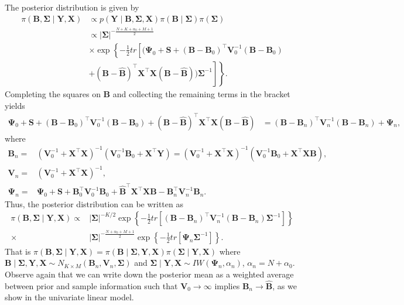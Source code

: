 The posterior distribution is given by
\begin{align*}
	\pi({\bm{B}},{\bm{\Sigma}}\mid {\bm{Y}},{\bm{X}})&\propto  p({\bm{Y}}\mid {\bm{B}},{\bm{\Sigma}},{\bm{X}}) \pi({\bm{B}}\mid  {\bm \Sigma})\pi({\bm{\Sigma}})\\
	&\propto \left|{\bm{\Sigma}} \right|^{-\frac{N+K+\alpha_{0}+M+1}{2}}\\
	&\times\exp\left\lbrace -\frac{1}{2}tr\left[(\bm{\Psi}_{0}+{\bm{S}} +({\bm{B}}-{\bm{B}}_{0})^{\top}{\bm{V}}_{0}^{-1}({\bm{B}}-{\bm{B}}_{0})\right.\right.\\
	&\left.\left.   +({\bm{B}}-\widehat{\bm{B}})^{\top}{\bm{X}}^{\top}{\bm{X}}({\bm{B}}-\widehat{\bm{B}}))\bm{\Sigma}^{-1}\right]\right\rbrace .
\end{align*}
Completing the squares on ${\bm{B}}$ and collecting the remaining terms in the bracket yields
{\footnotesize{
\begin{align*}
	{\bm{\Psi}}_{0}+{\bm{S}} +({\bm{B}}-{\bm{B}}_{0})^{\top}{\bm{V}}_{0}^{-1}({\bm{B}}-{\bm{B}}_{0})+({\bm{B}}-\widehat{\bm{B}})^{\top}{\bm{X}}^{\top}{\bm{X}}({\bm{B}}-\widehat{\bm{B}})
	& = ({\bm{B}}-{\bm{B}}_n)^{\top}{\bm{V}}_n^{-1}({\bm{B}}-{\bm{B}}_n)+{\bm{\Psi}}_n,
\end{align*}
}}
where 
\begin{align*}
	{\bm{B}}_n = &({\bm{V}}_{0}^{-1}+{\bm{X}}^{\top}{\bm{X}})^{-1}({\bm{V}}_{0}^{-1}{\bm{B}}_{0}+{\bm{X}}^{\top}{\bm{Y}})=({\bm{V}}_{0}^{-1}+{\bm{X}}^{\top}{\bm{X}})^{-1}({\bm{V}}_{0}^{-1}{\bm{B}}_{0}+{\bm{X}}^{\top}{\bm{X}}\widehat{\bm{B}}),\\
	{\bm{V}}_n = &({\bm{V}}_{0}^{-1}+{\bm{X}}^{\top}{\bm{X}})^{-1},\\
	{\bm{\Psi}}_n= &{\bm{\Psi}}_{0}+{\bm{S}}+{\bm{B}}_{0}^{\top}{\bm{V}}_{0}^{-1}{\bm{B}}_{0}+\widehat{\bm{B}}^{\top}{\bm{X}}^{\top}{\bm{X}}\widehat{\bm{B}}-{\bm{B}}_n^{\top}{\bm{V}}_n^{-1}{\bm{B}}_n.
\end{align*}
Thus, the posterior distribution can be written as
\begin{align*}
	\pi({\bm{B}},{\bm \Sigma}\mid  {\bm{Y}}, {\bm{X}})\propto &\left|{\bm \Sigma} \right|^{-K/2}\exp\left\lbrace -\frac{1}{2} tr\left[({\bm{B}}-{\bm{B}}_n)^{\top}{\bm{V}}_n^{-1}({\bm{B}}-{\bm{B}}_n)   {\bm \Sigma}^{-1}\right]\right\rbrace \\
	\times & \left|{\bm \Sigma} \right|^{-\frac{N+\alpha_{0}+M+1}{2}}\exp\left\lbrace -\frac{1}{2} tr \left[ {\bm{\Psi}}_n{\bm \Sigma}^{-1}\right] \right\rbrace .
\end{align*}
That is $\pi({\bm{B}},{\bm \Sigma}\mid  {\bm{Y}}, {\bm{X}})=\pi ({\bm{B}}\mid  {\bm \Sigma},{\bm{Y}},{\bm{X}})\pi({\bm \Sigma}\mid  {\bm{Y}},{\bm{X}})$ where ${\bm{B}}\mid  {\bm \Sigma},{\bm{Y}}, {\bm{X}} \sim N_{K\times M}({\bm{B}}_n,{\bm{V}}_n,{\bm \Sigma})$ and ${\bm \Sigma}\mid  {\bm{Y}},{\bm{X}} \sim IW({\bm{\Psi}}_n,{\alpha}_n)$, $\alpha_n= N+\alpha_{0}$. Observe again that we can write down the posterior mean as a weighted average between prior and sample information such that ${\bm{V}}_0\rightarrow\infty$ implies ${\bm{B}}_n\rightarrow\hat{{\bm{B}}}$, as we show in the univariate linear model.

